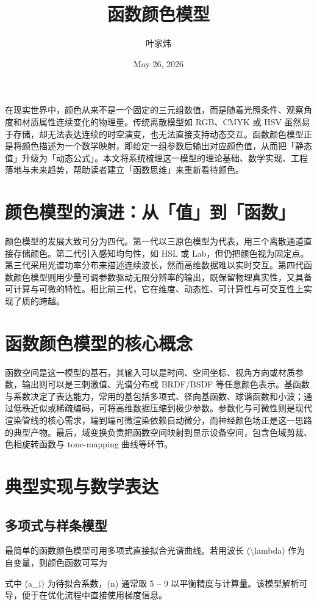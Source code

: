 \title{函数颜色模型}
\author{叶家炜}
\date{May 26, 2026}
\maketitle
在现实世界中，颜色从来不是一个固定的三元组数值，而是随着光照条件、观察角度和材质属性连续变化的物理量。传统离散模型如 RGB、CMYK 或 HSV 虽然易于存储，却无法表达连续的时空演变，也无法直接支持动态交互。函数颜色模型正是将颜色描述为一个数学映射，即给定一组参数后输出对应颜色值，从而把「静态值」升级为「动态公式」。本文将系统梳理这一模型的理论基础、数学实现、工程落地与未来趋势，帮助读者建立「函数思维」来重新看待颜色。\par
\chapter{颜色模型的演进：从「值」到「函数」}
颜色模型的发展大致可分为四代。第一代以三原色模型为代表，用三个离散通道直接存储颜色。第二代引入感知均匀性，如 HSL 或 Lab，但仍把颜色视为固定点。第三代采用光谱功率分布来描述连续波长，然而高维数据难以实时交互。第四代函数颜色模型则用少量可调参数驱动无限分辨率的输出，既保留物理真实性，又具备可计算与可微的特性。相比前三代，它在维度、动态性、可计算性与可交互性上实现了质的跨越。\par
\chapter{函数颜色模型的核心概念}
函数空间是这一模型的基石，其输入可以是时间、空间坐标、视角方向或材质参数，输出则可以是三刺激值、光谱分布或 BRDF/BSDF 等任意颜色表示。基函数与系数决定了表达能力，常用的基包括多项式、径向基函数、球谐函数和小波；通过低秩近似或稀疏编码，可将高维数据压缩到极少参数。参数化与可微性则是现代渲染管线的核心需求，端到端可微渲染依赖自动微分，而神经颜色场正是这一思路的典型产物。最后，域变换负责把函数空间映射到显示设备空间，包含色域剪裁、色相旋转函数与 tone-mapping 曲线等环节。\par
\chapter{典型实现与数学表达}
\section{多项式与样条模型}
最简单的函数颜色模型可用多项式直接拟合光谱曲线。若用波长 (\textbackslash{}lambda) 作为自变量，则颜色函数可写为\par
[ C(\textbackslash{}lambda) = \textbackslash{}sum\_{}\{{}i=0\}{}\^{}\{{}n\}{} a\_{}i \textbackslash{}lambda\^{}i ]\par
式中 (a\_{}i) 为待拟合系数，(n) 通常取 5 – 9 以平衡精度与计算量。该模型解析可导，便于在优化流程中直接使用梯度信息。\par
